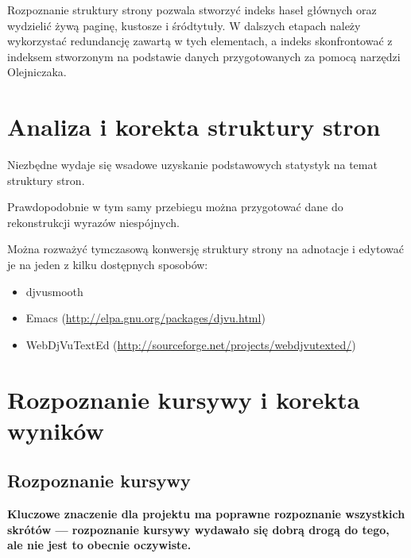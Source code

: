 \documentclass[12]{mwart}
\begin{document}
Rozpoznanie struktury strony pozwala stworzyć indeks haseł głównych
oraz wydzielić żywą paginę, kustosze i śródtytuły. W dalszych etapach
należy wykorzystać redundancję zawartą w tych elementach, a indeks
skonfrontować z indeksem stworzonym na podstawie danych przygotowanych
za pomocą narzędzi Olejniczaka.

\section{Analiza i korekta struktury stron}
\label{sec:korekta-strukt-stron}

Niezbędne wydaje się wsadowe uzyskanie podstawowych statystyk na temat
struktury stron.

Prawdopodobnie w tym samy przebiegu można przygotować dane do
rekonstrukcji wyrazów niespójnych.

Można rozważyć tymczasową konwersję struktury strony na adnotacje i
edytować je na jeden z kilku dostępnych sposobów:

  \begin{itemize}
  \item \textsf{djvusmooth}
  \item \textsf{Emacs} (\url{http://elpa.gnu.org/packages/djvu.html})
  \item \textsf{WebDjVuTextEd} (\url{http://sourceforge.net/projects/webdjvutexted/})
  \end{itemize}


\section{Rozpoznanie kursywy i korekta wyników}
\label{sec:rozpoznanie-kursywy}


\subsection{Rozpoznanie kursywy}
\label{sec:rozpoznanie-kursywy-1}

\textbf{Kluczowe znaczenie dla projektu ma poprawne rozpoznanie wszystkich
skrótów --- rozpoznanie kursywy wydawało się dobrą drogą do tego, ale
nie jest to obecnie oczywiste.}
\end{document}
